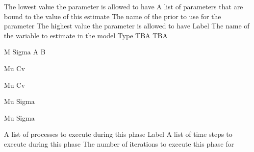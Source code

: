 \par\textbf{}\par
{}\par\par
{} {The lowest value the parameter is allowed to have}
 {A list of parameters that are bound to the value of this estimate}
 {The name of the prior to use for the parameter}
 {The highest value the parameter is allowed to have}
 {Label}
 {The name of the variable to estimate in the model}
 {Type}
 {TBA}
 {TBA}
\par\textbf{}\par
{} {M}
 {Sigma}
 {A}
 {B}
\par\textbf{}\par
{} {Mu}
 {Cv}
\par\textbf{}\par
{} {Mu}
 {Cv}
\par\textbf{}\par
{} {Mu}
 {Sigma}
\par\textbf{}\par
{} {Mu}
 {Sigma}
\par\textbf{}\par
\par\textbf{}\par
{}\par\par
{} {A list of processes to execute during this phase}
 {Label}
 {A list of time steps to execute during this phase}
 {The number of iterations to execute this phase for}
\par\par
\par\textbf{}\par

